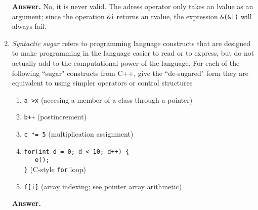 \documentclass[9pt]{article}
\begin{document}
\begin{enumerate}
      \textbf{Answer.} No, it is never valid. The adress operator only takes an
      lvalue as an argument; since the operation \verb|&i| returns an rvalue,
      the expression \verb|&(&i)| will always fail.
   \item \textit{Syntactic sugar} refers to programming language constructs that
         are designed to make programming in the language easier to read or to
         express, but do not actually add to the computational power of the
         language. For each of the following ``sugar" constructs from C++, give
         the ``de-sugared" form they are equivalent to using simpler operators
         or control structures
         \begin{enumerate}
            \item \verb|a->x| (accesing a member of a class through a pointer)
            \item \verb|b++| (postincrement)
            \item \verb|c *= 5| (multiplication assignment)
            \item \verb|for(int d = 0; d < 10; d++) {| \\
                  \verb|   e();| \\
                  \verb|}| (C-style \verb|for| loop)
            \item \verb|f[i]| (array indexing; see pointer array arithmetic)
         \end{enumerate}

      \textbf{Answer.}


\end{enumerate}
\end{document}
